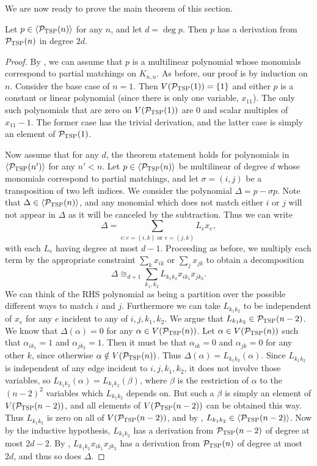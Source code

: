 We are now ready to prove the main theorem of this section. 
\begin{theorem}\label{thm:tsp-effective}
Let $p \in \langle \mathcal P_{\textsc{TSP}}(n) \rangle$ for any $n$, and let $d = \deg p$. Then $p$ has a derivation from $\mathcal P_{\textsc{TSP}}(n)$ in degree $2d$. 
\end{theorem}
\begin{proof}
By , we can assume that $p$ is a multilinear polynomial whose monomials correspond to partial matchings on $K_{n,n}$.
As before, our proof is by induction on $n$. Consider the base case of $n = 1$. 
Then $V(\mathcal P_{\textsc{TSP}}(1)) = \{1\}$ and either $p$ is a constant or linear polynomial (since there is only one variable, $x_{11}$).
The only such polynomials that are zero on $V(\mathcal P_{\textsc{TSP}}(1))$ are $0$ and scalar multiples of $x_{11} - 1$. 
The former case has the trivial derivation, and the latter case is simply an element of $\mathcal P_{\textsc{TSP}}(1)$. 

Now assume that for any $d$, the theorem statement holds for polynomials in $\langle \mathcal P_{\textsc{TSP}}(n') \rangle$ for any $n' < n$. 
Let $p \in \langle \mathcal P_{\textsc{TSP}}(n) \rangle$ be multilinear of degree $d$ whose monomials correspond to partial matchings, and let $\sigma = (i,j)$ be a transposition of two left indices.
We consider the polynomial $\Delta = p - \sigma p$. Note that $\Delta \in \langle \mathcal P_{\textsc{TSP}}(n) \rangle$, and any monomial which does not match either $i$ or $j$ will not appear in $\Delta$ as it will be canceled by the subtraction.
Thus we can write
\[\Delta = \sum_{e: e = (i,k) \text{ or } e = (j,k)} L_e x_e,\]
with each $L_e$ having degree at most $d-1$. Proceeding as before, we multiply each term by the appropriate constraint $\sum_k x_{ik}$ or $\sum_j x_{jk}$ to obtain a decomposition
\[\Delta \cong_{d+1} \sum_{k_1,k_2} L_{k_1k_2} x_{ik_1}x_{jk_2}.\]
We can think of the RHS polynomial as being a partition over the possible different ways to match $i$ and $j$.
Furthermore we can take $L_{k_1k_2}$ to be independent of $x_e$ for any $e$ incident to any of $i,j,k_1,k_2$. 
We argue that $L_{k_1k_2} \in \mathcal P_{\textsc{TSP}}(n-2)$. We know that $\Delta(\alpha) = 0$ for any $\alpha \in V(\mathcal P_{\textsc{TSP}}(n))$. Let $\alpha \in V(\mathcal P_{\textsc{TSP}}(n))$ such that $\alpha_{ik_1} = 1$ and $\alpha_{jk_2} = 1$. 
Then it must be that $\alpha_{ik} = 0$ and $\alpha_{jk} = 0$ for any other $k$, since otherwise $\alpha \notin V(\mathcal P_{\textsc{TSP}}(n))$.
Thus $\Delta(\alpha) = L_{k_1k_2}(\alpha)$. Since $L_{k_1k_2}$ is independent of any edge incident to $i,j,k_1,k_2$, it does not involve those variables, so $L_{k_1k_2}(\alpha) = L_{k_1k_2}(\beta)$, where $\beta$ is the restriction of $\alpha$ to the $(n-2)^2$ variables which $L_{k_1k_2}$ depends on. But such a $\beta$ is simply an element of $V(\mathcal P_{\textsc{TSP}}(n-2))$, and all elements of $V(\mathcal P_{\textsc{TSP}}(n-2))$ can be obtained this way. Thus $L_{k_1k_2}$ is zero on all of $V(\mathcal P_{\textsc{TSP}}(n-2))$, and by , $L_{k_1k_2} \in \langle \mathcal P_{\textsc{TSP}}(n-2) \rangle$. Now by the inductive hypothesis, $L_{k_1k_2}$ has a derivation from $\mathcal P_{\textsc{TSP}}(n-2)$ of degree at most $2d-2$. By , $L_{k_1k_2}x_{ik_1}x_{jk_2}$ has a derivation from $\mathcal P_{\textsc{TSP}}(n)$ of degree at most $2d$, and thus so does $\Delta$.


\end{proof}
